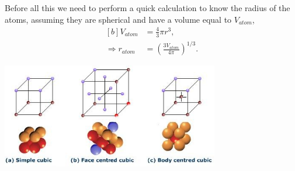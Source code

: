 
\begin{questions}
\begin{solution}
Before all this we need to perform a quick calculation to know the radius of the atoms, assuming they are spherical and have a volume equal to $V_{atom}$,
\begin{equation}
  \begin{aligned}[b]
    V_{atom} &= \frac{4}{3}\pi r^3,\\
    \Rightarrow r_{atom} &= \left(\frac{3V_{atom}}{4\pi}\right)^{1/3}.
  \end{aligned}
  \label{radius}
\end{equation}


\begin{center}
  \includegraphics[width=95mm]{cells}
\end{center}

\label{u:cells}\vspace{0.5cm}


\end{solution}
\end{questions}

